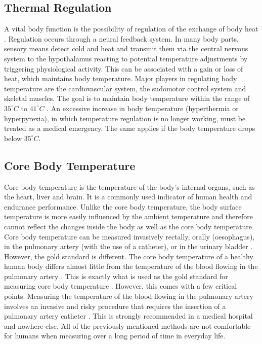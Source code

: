 \subsection{Thermal Regulation}
\label{Background:BodyTemperature:ThermalRegulation}
A vital body function is the possibility of regulation of the exchange of body heat \cite{grodzinskyUnderstandingFeverBody2020}.
Regulation occurs through a neural feedback system. 
In many body parts, sensory means detect cold and heat and transmit them via the central nervous system to the hypothalamus reacting to potential temperature adjustments by triggering physiological activity. 
This can be associated with a gain or loss of heat, which maintains body temperature.
Major players in regulating body temperature are the cardiovascular system, the sudomotor control system and skeletal muscles. 
The goal is to maintain body temperature within the range of $35^\circ C$ to $41^\circ C$ \cite{pierauTemperatursensibilitaet2001}. 
An excessive increase in body temperature (hyperthermia or hyperpyrexia), in which temperature regulation is no longer working, must be treated as a medical emergency.
The same applies if the body temperature drops below $35^\circ C$.

\subsection{Core Body Temperature}
\label{Background:BodyTemperature:CBT}
Core body temperature is the temperature of the body's internal organs, such as the heart, liver and brain. 
It is a commonly used indicator of human health and endurance performance.
Unlike the core body temperature, the body surface temperature is more easily influenced by the ambient temperature and therefore cannot reflect the changes inside the body as well as the core body temperature.
Core body temperature can be measured invasively rectally, orally (oesophagus), in the pulmonary artery (with the use of a catheter), or in the urinary bladder \cite{moranCoreTemperatureMeasurement2002a}.
However, the gold standard is different.
The core body temperature of a healthy human body differs almost little from the temperature of the blood flowing in the pulmonary artery \cite{krizanacFemoroiliacalArteryPulmonary2013, holtzclawMonitoringBodyTemperature1993}.
This is exactly what is used as the gold standard for measuring core body temperature \cite{krizanacFemoroiliacalArteryPulmonary2013, holtzclawMonitoringBodyTemperature1993, fulbrookCoreBodyTemperature1997, maxtonEstimatingCoreTemperature2004}.
However, this comes with a few critical points.
Measuring the temperature of the blood flowing in the pulmonary artery involves an invasive and risky procedure that requires the insertion of a pulmonary artery catheter \cite{yeohRevisitingTympanicMembrane2017}.
This is strongly recommended in a medical hospital and nowhere else.
All of the previously mentioned methods are not comfortable for humans when measuring over a long period of time in everyday life.

